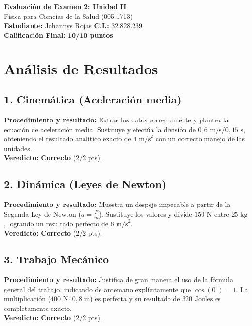 \documentclass[12pt,letterpaper]{article}
\begin{document}
\begin{center}
    \Large \textbf{Evaluación de Examen 2: Unidad II} \\
    \large Física para Ciencias de la Salud (005-1713) \\
    \vspace{0.5cm}
    \textbf{Estudiante:} Johannys Rojas \quad \textbf{C.I.:} 32.828.239
    \vspace{0.3cm} \\
    \large \textbf{Calificación Final: 10/10 puntos}
\end{center}

\vspace{0.5cm}

\section*{Análisis de Resultados}

\subsection*{1. Cinemática (Aceleración media)}
\textbf{Procedimiento y resultado:} Extrae los datos correctamente y plantea la ecuación de aceleración media. Sustituye y efectúa la división de $0,6 \text{ m/s} / 0,15 \text{ s}$, obteniendo el resultado analítico exacto de $4 \text{ m/s}^2$ con un correcto manejo de las unidades. \\
\textbf{Veredicto:} \textbf{Correcto} (2/2 pts).

\subsection*{2. Dinámica (Leyes de Newton)}
\textbf{Procedimiento y resultado:} Muestra un despeje impecable a partir de la Segunda Ley de Newton ($a = \frac{F}{m}$). Sustituye los valores y divide $150 \text{ N}$ entre $25 \text{ kg}$, logrando un resultado perfecto de $6 \text{ m/s}^2$. \\
\textbf{Veredicto:} \textbf{Correcto} (2/2 pts).

\subsection*{3. Trabajo Mecánico}
\textbf{Procedimiento y resultado:} Justifica de gran manera el uso de la fórmula general del trabajo, indicando de antemano explícitamente que $\cos(0^\circ) = 1$. La multiplicación ($400 \text{ N} \cdot 0,8 \text{ m}$) es perfecta y su resultado de $320 \text{ Joules}$ es completamente exacto. \\
\textbf{Veredicto:} \textbf{Correcto} (2/2 pts).
\end{document}
